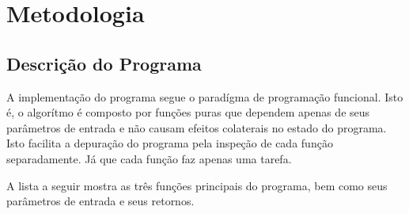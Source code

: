\documentclass{aleph-revista}
\begin{document}
\membrete

\vspace{1em}

\section{Metodologia}

\subsection{Descrição do Programa}

A implementação do programa segue o paradígma de programação funcional. Isto é, o algorítmo é composto por funções puras que dependem apenas de seus parâmetros de entrada e não causam efeitos colaterais no estado do programa. Isto facilita a depuração do programa pela inspeção de cada função separadamente. Já que cada função faz apenas uma tarefa.

A lista a seguir mostra as três funções principais do programa, bem como seus parâmetros de entrada e seus retornos.
\end{document}
